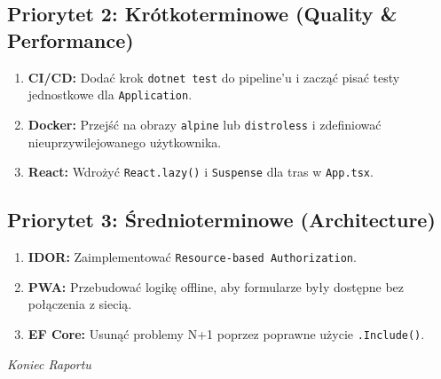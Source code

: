 \documentclass[a4paper,12pt]{article}
\begin{document}
\subsection{Priorytet 2: Krótkoterminowe (Quality & Performance)}
\begin{enumerate}
    \item \textbf{CI/CD:} Dodać krok \texttt{dotnet test} do pipeline'u i zacząć pisać testy jednostkowe dla \texttt{Application}.
    \item \textbf{Docker:} Przejść na obrazy \texttt{alpine} lub \texttt{distroless} i zdefiniować nieuprzywilejowanego użytkownika.
    \item \textbf{React:} Wdrożyć \texttt{React.lazy()} i \texttt{Suspense} dla tras w \texttt{App.tsx}.
\end{enumerate}

\subsection{Priorytet 3: Średnioterminowe (Architecture)}
\begin{enumerate}
    \item \textbf{IDOR:} Zaimplementować \texttt{Resource-based Authorization}.
    \item \textbf{PWA:} Przebudować logikę offline, aby formularze były dostępne bez połączenia z siecią.
    \item \textbf{EF Core:} Usunąć problemy N+1 poprzez poprawne użycie \texttt{.Include()}.
\end{enumerate}

\vspace{2cm}
\begin{center}
    \textit{Koniec Raportu}
\end{center}
\end{document}
